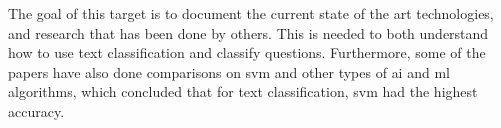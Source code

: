 \label{chap:chapter2}
The goal of this target is to document the current state of the art technologies, and research that has been done by others. 
This is needed to both understand how to use text classification and classify questions. 
Furthermore, some of the papers have also done comparisons on \gls{svm} and other types of \gls{ai} and \gls{ml} algorithms, 
which concluded that for text classification, \gls{svm} had the highest accuracy.

\begin{comment}
I can either use \verb|\cite{ChangLin2011}| and get: \cite{ChangLin2011}. \\
Or I can use \verb|\citet{ChangLin2011}| and get: \citet{ChangLin2011}. \\
\verb|\cite| is based on \verb|\renewcommand*{\cite}{\autocite}|, \\
and \verb|\citet| is based on \verb|\newcommand{\citet}{\textcite}|. \\
Unfortunately, you can't get the year, but at least you can now get in-text citation. 
\end{comment}

